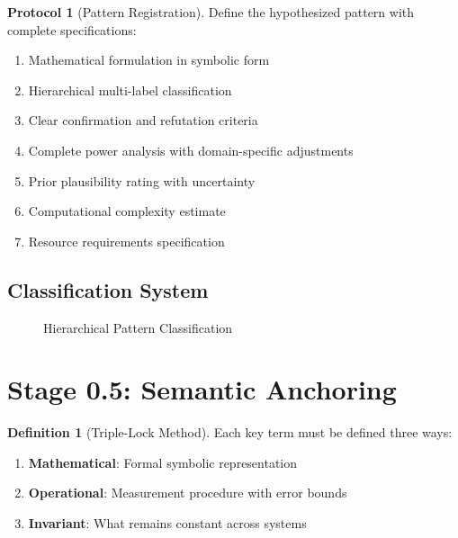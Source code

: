 \documentclass[12pt,oneside]{memoir}
\theoremstyle{plain}
\theoremstyle{definition}
\newtheorem{definition}[theorem]{Definition}
\newtheorem{protocol}[theorem]{Protocol}
\theoremstyle{remark}
\begin{document}
\begin{protocol}[Pattern Registration]
Define the hypothesized pattern with complete specifications:
\begin{enumerate}
\item Mathematical formulation in symbolic form
\item Hierarchical multi-label classification
\item Clear confirmation and refutation criteria
\item Complete power analysis with domain-specific adjustments
\item Prior plausibility rating with uncertainty
\item Computational complexity estimate
\item Resource requirements specification
\end{enumerate}
\end{protocol}

\subsection{Classification System}

\begin{figure}[h]
\centering
{}
\caption{Hierarchical Pattern Classification}
\end{figure}

\section{Stage 0.5: Semantic Anchoring}

\begin{definition}[Triple-Lock Method]
Each key term must be defined three ways:
\begin{enumerate}
\item \textbf{Mathematical}: Formal symbolic representation
\item \textbf{Operational}: Measurement procedure with error bounds
\item \textbf{Invariant}: What remains constant across systems
\end{enumerate}
\end{definition}
\end{document}
